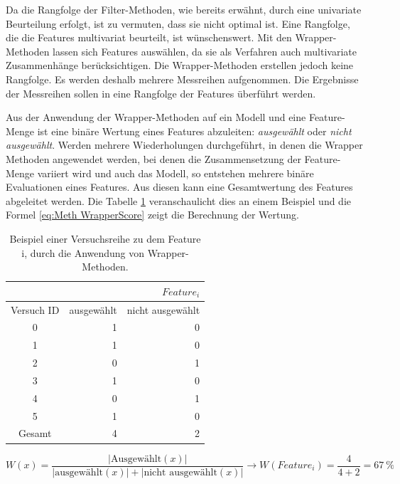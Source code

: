 Da die Rangfolge der Filter-Methoden, wie bereits erwähnt, durch eine univariate Beurteilung erfolgt, ist zu vermuten, dass sie nicht optimal ist. Eine Rangfolge, die die Features multivariat beurteilt, ist wünschenswert. Mit den Wrapper-Methoden lassen sich Features auswählen, da sie als Verfahren auch multivariate Zusammenhänge berücksichtigen. Die Wrapper-Methoden erstellen jedoch keine Rangfolge. Es werden deshalb mehrere Messreihen aufgenommen. Die Ergebnisse der Messreihen sollen in eine Rangfolge der Features überführt werden.\par

Aus der Anwendung der Wrapper-Methoden auf ein Modell und eine Feature-Menge ist eine binäre Wertung eines Features abzuleiten: \textit{ausgewählt} oder \textit{nicht ausgewählt}. Werden mehrere Wiederholungen durchgeführt, in denen die Wrapper Methoden angewendet werden, bei denen die Zusammensetzung der Feature-Menge variiert wird und auch das Modell, so entstehen mehrere binäre Evaluationen eines Features. Aus diesen kann eine Gesamtwertung des Features abgeleitet werden. Die Tabelle \ref{tab:bspWrapScore} veranschaulicht dies an einem Beispiel und die Formel \ref{eq:Meth WrapperScore} zeigt die Berechnung der Wertung.

\begin{table}[htb]
    \centering
    \caption{Beispiel einer Versuchsreihe zu dem Feature i, durch die Anwendung von Wrapper-Methoden.}
    \begin{tabular}{|c|r|r|}
        \hline
        \multicolumn{3}{|r|}{\(Feature_i\)} \\
        \hline
        Versuch ID & ausgewählt & nicht ausgewählt \\
        \hline
        0 & 1 & 0 \\
        1 & 1 & 0 \\
        2 & 0 & 1 \\
        3 & 1 & 0 \\
        4 & 0 & 1 \\
        5 & 1 & 0 \\
        \hline
        \hline
        Gesamt & 4 & 2 \\
        \hline
    \end{tabular}
    \label{tab:bspWrapScore}
\end{table}

\begin{equation}
W(x) = \frac{|\text{Ausgewählt}(x)|}{|\text{ausgewählt}(x)| + |\text{nicht ausgewählt}(x)|} \rightarrow W(Feature_i)=\frac{4}{4+2} = 67\ \%
\label{eq:Meth WrapperScore}
\end{equation}

